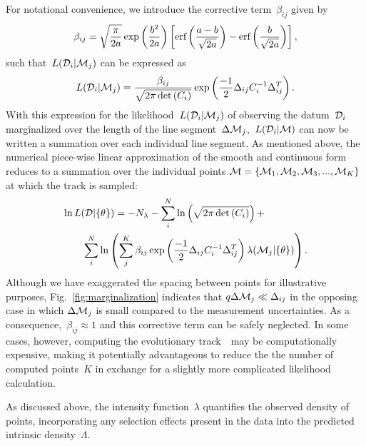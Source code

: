 \documentclass[foo.tex]{subfiles}
\begin{document}
For notational convenience, we introduce the corrective term~$\beta_{ij}$ given
by
\begin{equation}
\beta_{ij} = \sqrt{\frac{\pi}{2a}} \exp\left(\frac{b^2}{2a}\right)
\left[\text{erf}\left(\frac{a - b}{\sqrt{2a}}\right) - \text{erf}\left(\frac{b}{\sqrt{2a}}
\right)\right],
\label{eq:corrective_beta}
\end{equation}
such that~$L(\mathcal{D}_i | \mathcal{M}_j)$ can be expressed as
\begin{equation}
L(\mathcal{D}_i | \mathcal{M}_j) = \frac{\beta_{ij}}{\sqrt{2\pi \det{(C_i)}}}
\exp\left(\frac{-1}{2}\Delta_{ij} C_i^{-1} \Delta_{ij}^T\right).
\end{equation}
With this expression for the likelihood~$L(\mathcal{D}_i | \mathcal{M}_j)$ of
observing the datum~$\mathcal{D}_i$ marginalized over the length of the line
segment~$\Delta\mathcal{M}_j$,~$L(\mathcal{D}_i | \mathcal{M})$ can now be
written a summation over each individual line segment.
As mentioned above, the numerical piece-wise linear approximation of the smooth
and continuous form reduces to a summation over the individual points
$\mathcal{M} = \{\mathcal{M}_1, \mathcal{M}_2, \mathcal{M}_3, ..., \mathcal{M}_K\}$
at which the track is sampled:
\begin{equation}\begin{split}
&\ln L(\mathcal{D} | \{\theta\}) = -N_\lambda
- \sum_i^N \ln \left(\sqrt{2\pi \det{(C_i)}}\right) +
\\
&\qquad \sum_i^N \ln \left(
\sum_j^K \beta_{ij}
\exp\left(\frac{-1}{2}\Delta_{ij}C_i^{-1}\Delta_{ij}^T\right)
\lambda(\mathcal{M}_j | \{\theta\})
\right).
\end{split}\end{equation}
Although we have exaggerated the spacing between points for illustrative
purposes, Fig.~\ref{fig:marginalization} indicates that
$q\Delta\mathcal{M}_j \ll \Delta_{ij}$ in the opposing case in which
$\Delta\mathcal{M}_j$ is small compared to the measurement uncertainties.
As a consequence,~$\beta_{ij} \approx 1$ and this corrective term can be safely
neglected.
In some cases, however, computing the evolutionary track~~may be
computationally expensive, making it potentially advantageous to reduce the
the number of computed points~$K$ in exchange for a slightly more complicated
likelihood calculation.
\par
As discussed above, the intensity function~$\lambda$ quantifies the observed
density of points, incorporating any selection effects present in the data into
the predicted intrinsic density~$\Lambda$.
\end{document}
